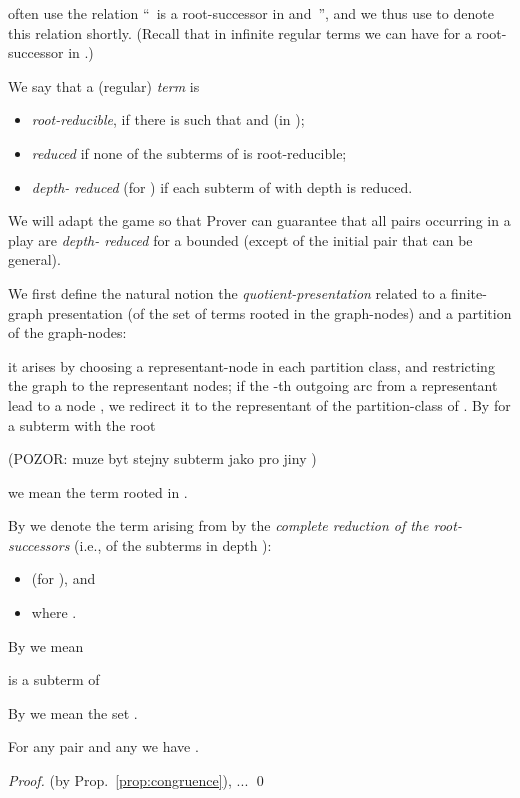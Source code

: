 \documentclass{llncs}
\begin{document}
\iffalse

often use the relation ``\, is a root-successor in 
and \,'', and
we thus use   to denote this relation shortly.
(Recall that in infinite regular terms we can have  for a
root-successor  in .)



We say that a (regular) \emph{term}  is 
\begin{itemize}
	\item
		\emph{root-reducible}, if there is  such that
		 and  (in );
\item
	\emph{reduced} if none of the subterms of   is
root-reducible; 
\item
	\emph{depth- reduced} (for )
if each subterm of  with depth  is reduced.
\end{itemize}
We will adapt the game so that Prover can guarantee that all pairs
 occurring in a play are 	\emph{depth- reduced} for a
bounded  (except of the initial pair that can be general).

We first define the natural notion 
the \emph{quotient-presentation} related to a finite-graph presentation 
(of the set of terms rooted in the graph-nodes)
and a partition  of the graph-nodes:

it arises by choosing a representant-node in each partition class,
and restricting the graph to the representant nodes; if the -th
outgoing arc from a representant lead to a node , we
redirect it to the representant of the partition-class of
. By  for a subterm  with the root
 

(POZOR:  muze byt stejny subterm jako pro jiny )

we mean the term rooted  in .

By  
 we denote the term arising from  
by the \emph{complete reduction of the root-successors} (i.e., of the
subterms in depth ):
\begin{itemize}
	\item
		 (for ), and 
	\item
		 where .
\end{itemize}

By  we mean 

 is a subterm of 

By  we mean the set .

\begin{proposition}\label{prop:declowerEL}
For any pair  and any  
we have .
\end{proposition}	

\begin{proof}
(by Prop.~\ref{prop:congruence}), ...
	\qed
\end{proof}
\end{document}
